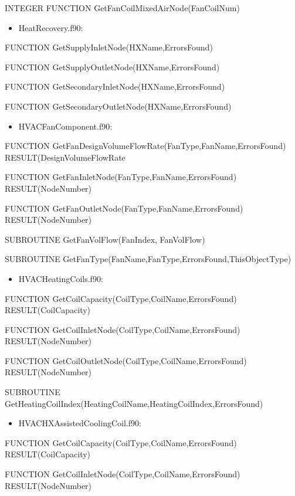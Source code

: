 INTEGER FUNCTION GetFanCoilMixedAirNode(FanCoilNum)

\begin{itemize}
\tightlist
\item
  HeatRecovery.f90:
\end{itemize}

FUNCTION GetSupplyInletNode(HXName,ErrorsFound)

FUNCTION GetSupplyOutletNode(HXName,ErrorsFound)

FUNCTION GetSecondaryInletNode(HXName,ErrorsFound)

FUNCTION GetSecondaryOutletNode(HXName,ErrorsFound)

\begin{itemize}
\tightlist
\item
  HVACFanComponent.f90:
\end{itemize}

FUNCTION GetFanDesignVolumeFlowRate(FanType,FanName,ErrorsFound) RESULT(DesignVolumeFlowRate

FUNCTION GetFanInletNode(FanType,FanName,ErrorsFound) RESULT(NodeNumber)

FUNCTION GetFanOutletNode(FanType,FanName,ErrorsFound) RESULT(NodeNumber)

SUBROUTINE GetFanVolFlow(FanIndex, FanVolFlow)

SUBROUTINE GetFanType(FanName,FanType,ErrorsFound,ThisObjectType)

\begin{itemize}
\tightlist
\item
  HVACHeatingCoils.f90:
\end{itemize}

FUNCTION GetCoilCapacity(CoilType,CoilName,ErrorsFound) RESULT(CoilCapacity)

FUNCTION GetCoilInletNode(CoilType,CoilName,ErrorsFound) RESULT(NodeNumber)

FUNCTION GetCoilOutletNode(CoilType,CoilName,ErrorsFound) RESULT(NodeNumber)

SUBROUTINE GetHeatingCoilIndex(HeatingCoilName,HeatingCoilIndex,ErrorsFound)

\begin{itemize}
\tightlist
\item
  HVACHXAssistedCoolingCoil.f90:
\end{itemize}

FUNCTION GetCoilCapacity(CoilType,CoilName,ErrorsFound) RESULT(CoilCapacity)

FUNCTION GetCoilInletNode(CoilType,CoilName,ErrorsFound) RESULT(NodeNumber)

